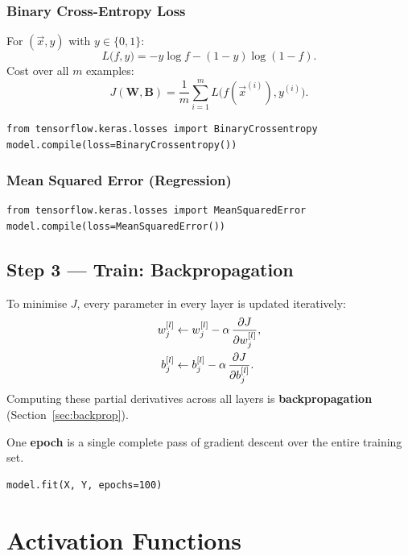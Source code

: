 \subsubsection{Binary Cross-Entropy Loss}
For $(\vec{x},y)$ with $y\in\{0,1\}$:
\begin{equation}
L\bigl(f,y\bigr)=-y\log f-(1-y)\log(1-f).
\end{equation}
Cost over all $m$ examples:
\begin{equation}
J(\mathbf{W},\mathbf{B})=\frac{1}{m}\sum_{i=1}^m L\!\bigl(f(\vec{x}^{(i)}),y^{(i)}\bigr).
\end{equation}
\begin{lstlisting}
from tensorflow.keras.losses import BinaryCrossentropy
model.compile(loss=BinaryCrossentropy())
\end{lstlisting}

\subsubsection{Mean Squared Error (Regression)}
\begin{lstlisting}
from tensorflow.keras.losses import MeanSquaredError
model.compile(loss=MeanSquaredError())
\end{lstlisting}

\subsection{Step 3 --- Train: Backpropagation}

To minimise $J$, every parameter in every layer is updated iteratively:
\begin{align}
w_j^{[l]}&\leftarrow w_j^{[l]}-\alpha\,\dfrac{\partial J}{\partial w_j^{[l]}},\\
b_j^{[l]}&\leftarrow b_j^{[l]}-\alpha\,\dfrac{\partial J}{\partial b_j^{[l]}}.
\end{align}
Computing these partial derivatives across all layers is
\textbf{backpropagation} (Section~\ref{sec:backprop}).

\begin{definition}[Epoch]
One \textbf{epoch} is a single complete pass of gradient descent over the
entire training set.
\end{definition}
\begin{lstlisting}
model.fit(X, Y, epochs=100)
\end{lstlisting}

\section{Activation Functions}

